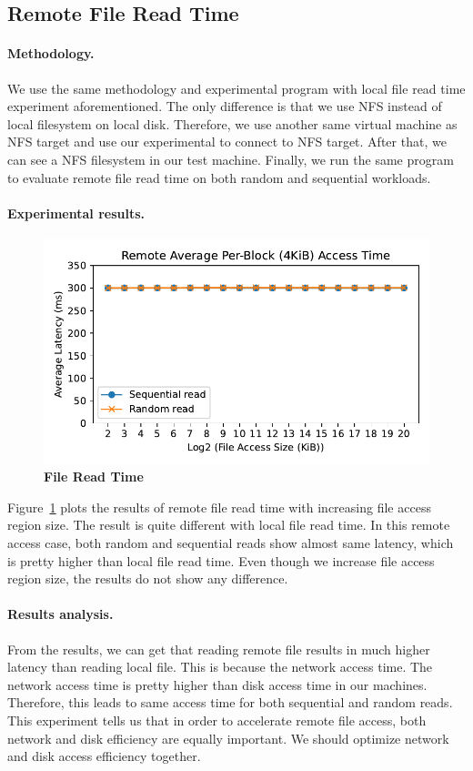 \subsection{Remote File Read Time}
\paragraph{Methodology.}
We use the same methodology and experimental program with local file read time experiment aforementioned. The only difference is that we use NFS instead of local filesystem on local disk. Therefore, we use another same virtual machine as NFS target and use our experimental to connect to NFS target. After that, we can see a NFS filesystem in our test machine. Finally, we run the same program to evaluate remote file read time on both random and sequential workloads.

\paragraph{Experimental results.}
\begin{figure}[t]
	\centering
	\includegraphics[width=0.98\linewidth]{sourcecode/file/file_remote.pdf}
	\caption{\label{fig:remote_file_read_time} \textbf{File Read Time}}
\end{figure}
Figure~\ref{fig:remote_file_read_time} plots the results of remote file read time with increasing file access region size. The result is quite different with local file read time. In this remote access case, both random and sequential reads show almost same latency, which is pretty higher than local file read time. Even though we increase file access region size, the results do not show any difference.

\paragraph{Results analysis.}
From the results, we can get that reading remote file results in much higher latency than reading local file. This is because the network access time. The network access time is pretty higher than disk access time in our machines. Therefore, this leads to same access time for both sequential and random reads. This experiment tells us that in order to accelerate remote file access, both network and disk efficiency are equally important. We should optimize network and disk access efficiency together. 


